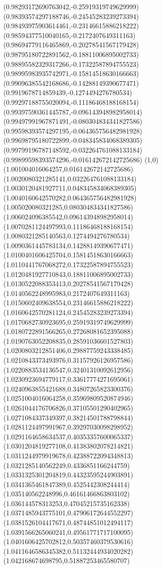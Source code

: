 \documentclass[12pt]{article}
\theoremstyle{plain}
\theoremstyle{definition}
\theoremstyle{remark}
\begin{document}
\begin{figure}
{  (0.98293172690763042,-0.25919319749629999)%
  (0.98393574297188746,-0.24545283239273394)%
  (0.98493975903614461,-0.23146615886218222)%
  (0.98594377510040165,-0.2172407649311163)%
  (0.98694779116465869,-0.20278541567179428)%
  (0.98795180722891562,-0.18811006895002733)%
  (0.98895582329317266,-0.17322587894755523)%
  (0.98995983935742971,-0.15814518630166663)%
  (0.99096385542168686,-0.14288149390677471)%
  (0.9919678714859439,-0.1274494276780534)%
  (0.99297188755020094,-0.11186468188168154)%
  (0.99397590361445787,-0.096143948982958014)%
  (0.99497991967871491,-0.080304834341827586)%
  (0.99598393574297195,-0.064365756482981928)%
  (0.99698795180722899,-0.048345834068389305)%
  (0.99799196787148592,-0.032264761088133184)%
  (0.99899598393574296,-0.016142672142725686)%
  (1,0)%
  (1.001004016064257,0.016142672142725686)%
  (1.0020080321285141,0.032264761088133184)%
  (1.0030120481927711,0.048345834068389305)%
  (1.0040160642570282,0.064365756482981928)%
  (1.005020080321285,0.080304834341827586)%
  (1.006024096385542,0.096143948982958014)%
  (1.0070281124497993,0.11186468188168154)%
  (1.0080321285140563,0.1274494276780534)%
  (1.0090361445783134,0.14288149390677471)%
  (1.0100401606425704,0.15814518630166663)%
  (1.0110441767068272,0.17322587894755523)%
  (1.0120481927710843,0.18811006895002733)%
  (1.0130522088353413,0.20278541567179428)%
  (1.0140562248995983,0.2172407649311163)%
  (1.0150602409638554,0.23146615886218222)%
  (1.0160642570281124,0.24545283239273394)%
  (1.0170682730923695,0.25919319749629999)%
  (1.0180722891566265,0.27268081652395088)%
  (1.0190763052208835,0.28591036601527803)%
  (1.0200803212851406,0.29887759243338485)%
  (1.0210843373493976,0.31157926126957586)%
  (1.0220883534136547,0.32401310092612956)%
  (1.0230923694779117,0.33617774271695061)%
  (1.0240963855421688,0.34807265823300376)%
  (1.0251004016064258,0.35969809520874946)%
  (1.0261044176706826,0.37105501290402965)%
  (1.0271084337349397,0.38214501788798844)%
  (1.0281124497991967,0.39297030098298952)%
  (1.0291164658634537,0.40353357600065337)%
  (1.0301204819277108,0.41383802078214821)%
  (1.0311244979919678,0.42388722094348813)%
  (1.0321285140562249,0.4336851166244759)%
  (1.0331325301204819,0.44323595244903891)%
  (1.0341365461847389,0.4525442308244414)%
  (1.035140562248996,0.46161466863803102)%
  (1.036144578313253,0.47045215735162338)%
  (1.0371485943775101,0.47906172644552297)%
  (1.0381526104417671,0.48744851012494117)%
  (1.0391566265060241,0.49561771717100095)%
  (1.0401606425702812,0.50357460379530616)%
  (1.0411646586345382,0.51132444934020282)%
  (1.042168674698795,0.51887253465580707)%
}
\end{figure}
\end{document}
